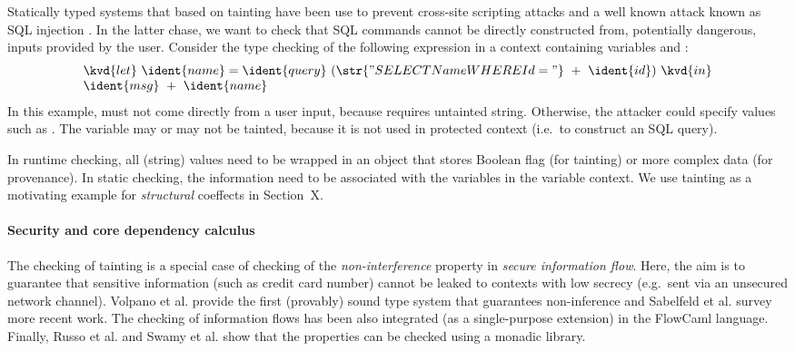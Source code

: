 Statically typed systems that based on tainting have been use to prevent cross-site scripting
attacks \cite{app-tainting-xss} and a well known attack known as SQL injection
\cite{app-tainting-sql,app-tainting-wasp}. In the latter chase, we want to check that SQL commands 
cannot be directly constructed from, potentially dangerous, inputs provided by the user. Consider the 
type checking of the following expression in a context containing variables  and :
%
\begin{equation*}
\begin{array}{l}
\kvd{let}~\ident{name} = \ident{query}~(\str{"SELECT Name WHERE Id = "}~+~\ident{id})~\kvd{in}\\
\ident{msg}~+~\ident{name}
\end{array}
\end{equation*}
%
In this example,  must not come directly from a user input, because  requires 
untainted string. Otherwise, the attacker could specify values such as . 
The variable  may or may not be tainted, because it is not used in protected context 
(i.e.~to construct an SQL query). 

In runtime checking, all (string) values need to be wrapped in an object that stores Boolean 
flag (for tainting) or more complex data (for provenance). In static checking, the information
need to be associated with the variables in the variable context. We use tainting as a motivating
example for \emph{structural} coeffects in Section~X.


\paragraph{Security and core dependency calculus}

The checking of tainting is a special case of checking of the \emph{non-interference} property 
in \emph{secure information flow}. Here, the aim is to guarantee that sensitive information (such
as credit card number) cannot be leaked to contexts with low secrecy (e.g.~sent via an unsecured
network channel). Volpano et al. \cite{app-secure-flow} provide the first (provably) sound type 
system that guarantees non-inference and Sabelfeld et al. \cite{app-secure-information-flow} survey
more recent work. The checking of information flows has been also integrated (as a single-purpose
extension) in the FlowCaml \cite{app-security-flowcaml} language. Finally, Russo et al. and 
Swamy et al. \cite{monad-secure-flow,monads-lightweight-ml} show that the properties can be checked
using a monadic library.

